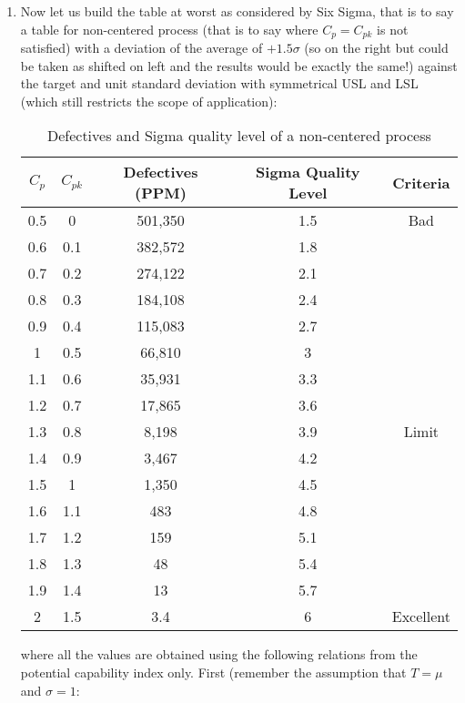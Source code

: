 \begin{enumerate}
	\item Now let us build the table at worst as considered by Six Sigma, that is to say a table for non-centered process (that is to say where $C_p=C_{pk}$ is not satisfied) with a deviation of the average of $+1.5\sigma$ (so on the right but could be taken as shifted on left and the results would be exactly the same!) against the target and unit standard deviation with symmetrical USL and LSL (which still restricts the scope of application):
	\begin{table}[H]
	\begin{center}
			\begin{tabular}{|c|c|c|c|c|}
				\hline
				\multicolumn{1}{c}{\cellcolor{black!30}\textbf{$C_p$}} & 
\multicolumn{1}{c}{\cellcolor{black!30}\textbf{$C_{pk}$}} & \multicolumn{1}{c}{\cellcolor{black!30}\textbf{Defectives (PPM)}} & \multicolumn{1}{c}{\cellcolor{black!30}\textbf{Sigma Quality Level}}  & \multicolumn{1}{c}{\cellcolor{black!30}\textbf{Criteria}}\\ \hline
		0.5 & 0 & 501,350 & 1.5 & Bad\\ \hline
		0.6 & 0.1 & 382,572 & 1.8 & {}\\ \hline
		0.7 & 0.2 & 274,122 & 2.1 & {}\\ \hline
		0.8 & 0.3 & 184,108 & 2.4 & {}\\ \hline
		0.9 & 0.4 & 115,083 & 2.7 & {}\\ \hline
		1 & 0.5 &  66,810 & 3 & {}\\ \hline
		1.1 & 0.6 & 35,931 & 3.3 & {}\\ \hline
		1.2 & 0.7 & 17,865 & 3.6 & {}\\ \hline
		1.3 & 0.8 & 8,198 & 3.9 & Limit\\ \hline
		1.4 & 0.9 & 3,467 & 4.2 & {}\\ \hline
		1.5 & 1 & 1,350 & 4.5 & {}\\ \hline
		1.6 & 1.1 & 483 & 4.8 & {}\\ \hline
		1.7 & 1.2 & 159 & 5.1 & {}\\ \hline
		1.8 & 1.3 & 48 & 5.4 & {}\\ \hline
		1.9 & 1.4 & 13 & 5.7 & {}\\ \hline
		2 & 1.5 & 3.4 & 6 & Excellent \\ \hline
	\end{tabular}
	\end{center}
	\caption{Defectives and Sigma quality level of a non-centered process}
	\end{table}
	where all the values are obtained using the following relations from the potential capability index only. First (remember the assumption that $T=\mu$ and $\sigma=1$:
	

\end{enumerate}
